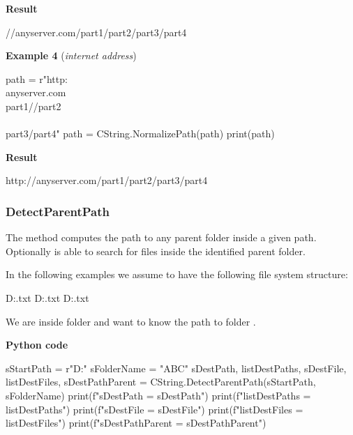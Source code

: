\textbf{Result}

\begin{robotlog}
//anyserver.com/part1/part2/part3/part4
\end{robotlog}

\vspace{1ex}

\textbf{Example 4} (\textit{internet address})

\begin{pythoncode}
path = r"http:\\anyserver.com\\part1//part2\\\\part3/part4"
path = CString.NormalizePath(path)
print(path)
\end{pythoncode}

\textbf{Result}

\begin{robotlog}
http://anyserver.com/part1/part2/part3/part4
\end{robotlog}

\newpage

\subsubsection{DetectParentPath}

The method  computes the path to any parent folder inside a given path. Optionally  is able
to search for files inside the identified parent folder.

In the following examples we assume to have the following file system structure:

\begin{robotlog}
D:\pathtest\ABC\DEF\GHI\FILE.txt
D:\pathtest\ABC\FILE.txt
D:\pathtest\RST\UVW\XYZ\FILE.txt
\end{robotlog}

We are inside folder  and want to know the path to folder .

\textbf{Python code}

\begin{pythoncode}
sStartPath  = r"D:\pathtest\ABC\DEF\GHI"
sFolderName = "ABC"
sDestPath, listDestPaths, sDestFile, listDestFiles, sDestPathParent = CString.DetectParentPath(sStartPath, sFolderName)
print(f"sDestPath       = {sDestPath}")
print(f"listDestPaths   = {listDestPaths}")
print(f"sDestFile       = {sDestFile}")
print(f"listDestFiles   = {listDestFiles}")
print(f"sDestPathParent = {sDestPathParent}")
\end{pythoncode}

